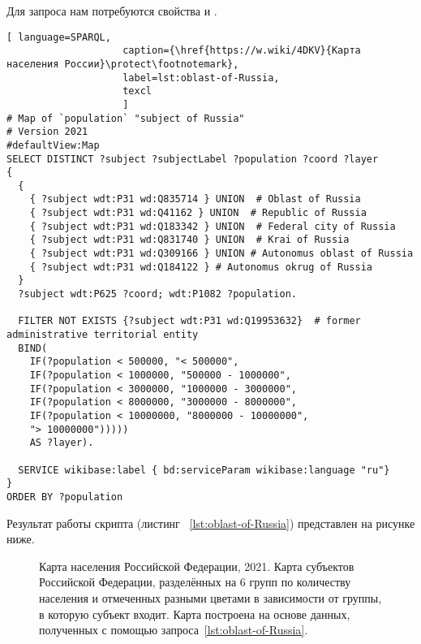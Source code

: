 Для запроса нам потребуются свойства  и .

\begin{lstlisting}[ language=SPARQL, 
                    caption={\href{https://w.wiki/4DKV}{Карта населения России}\protect\footnotemark},
                    label=lst:oblast-of-Russia,
                    texcl 
                    ]
# Map of `population` "subject of Russia"
# Version 2021
#defaultView:Map
SELECT DISTINCT ?subject ?subjectLabel ?population ?coord ?layer
{
  {
    { ?subject wdt:P31 wd:Q835714 } UNION  # Oblast of Russia
    { ?subject wdt:P31 wd:Q41162 } UNION  # Republic of Russia
    { ?subject wdt:P31 wd:Q183342 } UNION  # Federal city of Russia
    { ?subject wdt:P31 wd:Q831740 } UNION  # Krai of Russia
    { ?subject wdt:P31 wd:Q309166 } UNION # Autonomus oblast of Russia
    { ?subject wdt:P31 wd:Q184122 } # Autonomus okrug of Russia
  }   
  ?subject wdt:P625 ?coord; wdt:P1082 ?population.
  
  FILTER NOT EXISTS {?subject wdt:P31 wd:Q19953632}  # former administrative territorial entity
  BIND(
    IF(?population < 500000, "< 500000",
    IF(?population < 1000000, "500000 - 1000000",
    IF(?population < 3000000, "1000000 - 3000000",
    IF(?population < 8000000, "3000000 - 8000000",
    IF(?population < 10000000, "8000000 - 10000000",
    "> 10000000")))))
    AS ?layer).
  
  SERVICE wikibase:label { bd:serviceParam wikibase:language "ru"}
}
ORDER BY ?population
\end{lstlisting}%

Результат работы скрипта (листинг ~\protect\ref{lst:oblast-of-Russia}) представлен на рисунке ниже.

\begin{figure*}[h]

    \setlength{\fboxsep}{0pt}%
    \setlength{\fboxrule}{1pt}%
	\caption[Карта населения России, 2021.]{Карта населения Российской Федерации, 2021. Карта субъектов Российской Федерации, разделённых на 6 групп по количеству населения и отмеченных разными цветами в зависимости от группы, в которую субъект входит. Карта построена на основе данных, полученных с помощью запроса~\protect\ref{lst:oblast-of-Russia}.}%
\end{figure*} 

